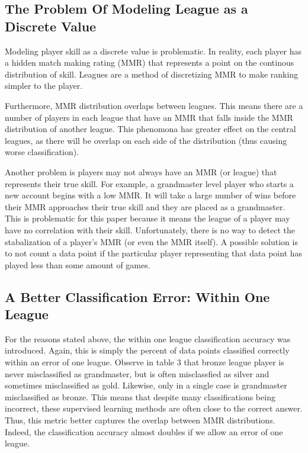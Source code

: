 \documentclass{article} %
\begin{document}
\subsection{The Problem Of Modeling League as a Discrete Value}

Modeling player skill as a discrete value is problematic. In reality, each player has a hidden match making rating (MMR) that represents a point on the  continous distribution of skill. Leagues are a method of discretizing MMR to make ranking simpler to the player. 

Furthermore, MMR distribution overlaps between leagues. This means there are a number of players in each league that have an MMR that falls inside the MMR distribution of another league. This phenomona has greater effect on the central leagues, as there will be overlap on each side of the distribution (thus causing worse classification). 

Another problem is players may not always have an MMR (or league) that represents their true skill. For example, a grandmaster level player who starts a new account begins with a low MMR. It will take a large number of wins before their MMR approaches their true skill and they are placed as a grandmaster. This is problematic for this paper because it means the league of a player may have no correlation with their skill. Unfortunately, there is no way to detect the stabalization of a player's MMR (or even the MMR itself). A possible solution is to not count a data point if the particular player representing that data point has played less than some amount of games. 

\subsection{A Better Classification Error: Within One League}

For the reasons stated above, the within one league classification accuracy was introduced. Again, this is simply the percent of data points classified correctly within an error of one league. Observe in table 3 that bronze league player is never misclassified as grandmaster, but is often misclassfied as silver and sometimes misclassified as gold. Likewise, only in a single case is grandmaster misclassified as bronze. This means that despite many classifications being incorrect, these supervised learning methods are often close to the correct answer. Thus, this metric better captures the overlap between MMR distributions. Indeed, the classification accuracy almost doubles if we allow an error of one league.
\end{document}

